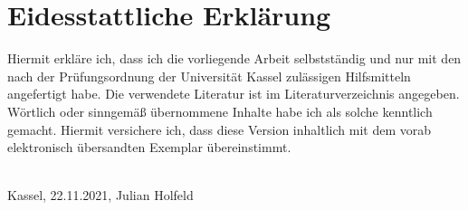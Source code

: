 \section*{Eidesstattliche Erklärung}

Hiermit erkläre ich, dass ich die vorliegende Arbeit selbstständig und nur mit den nach der Prüfungsordnung der Universität Kassel zulässigen Hilfsmitteln angefertigt habe.
Die verwendete Literatur ist im Literaturverzeichnis angegeben.
Wörtlich oder sinngemäß übernommene Inhalte habe ich als solche kenntlich gemacht.
Hiermit versichere ich, dass diese Version inhaltlich mit dem vorab elektronisch übersandten Exemplar übereinstimmt.

\vspace{1cm}



\begin{flushright}
  \underline{\hspace{7cm}} \\
  Kassel, 22.11.2021, Julian Holfeld
\end{flushright}